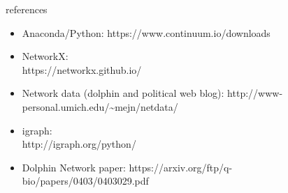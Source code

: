 \documentclass[12pt]{beamer}
\begin{document}
	\begin{frame}{references}
		\begin{itemize}
			\item Anaconda/Python: https://www.continuum.io/downloads
			\item NetworkX: \\https://networkx.github.io/
			\item Network data (dolphin and political web blog): http://www-personal.umich.edu/\textasciitilde mejn/netdata/
			\item igraph: \\
			http://igraph.org/python/
			\item Dolphin Network paper: https://arxiv.org/ftp/q-bio/papers/0403/0403029.pdf			
		\end{itemize}
	\end{frame}
\end{document}
